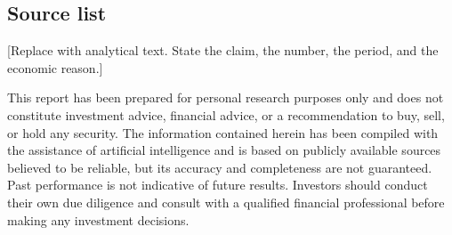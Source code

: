 \documentclass[10pt,a4paper]{article}
\newcommand{\ph}{[Replace with analytical text. State the claim, the number, the period, and the economic reason.]}
\begin{document}
\subsection{Source list}
\ph
\begin{ocaddisclaimer}
This report has been prepared for personal research purposes only and does not constitute investment advice, financial advice, or a recommendation to buy, sell, or hold any security. The information contained herein has been compiled with the assistance of artificial intelligence and is based on publicly available sources believed to be reliable, but its accuracy and completeness are not guaranteed. Past performance is not indicative of future results. Investors should conduct their own due diligence and consult with a qualified financial professional before making any investment decisions.
\end{ocaddisclaimer}
\end{document}
